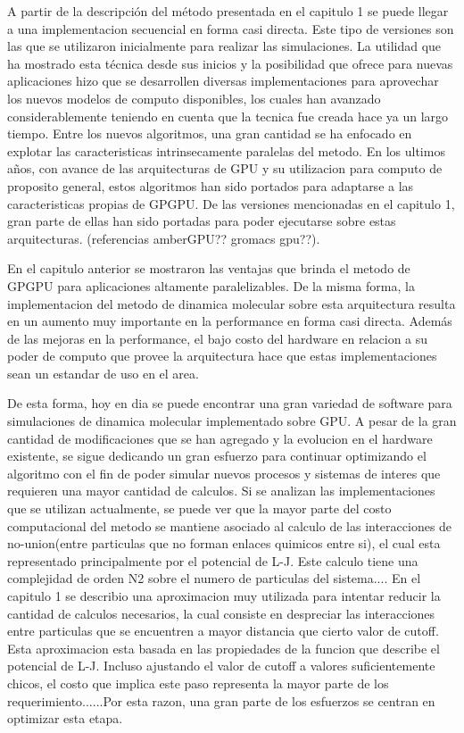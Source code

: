 \documentclass[a4paper,10pt]{report}
\begin{document}
A partir de la descripción del método presentada en el capitulo 1 se puede llegar a una implementacion secuencial en forma casi directa. Este tipo de versiones son las que se utilizaron inicialmente para realizar las simulaciones.
La utilidad que ha mostrado esta técnica desde sus inicios y la posibilidad que ofrece para nuevas aplicaciones hizo que se desarrollen diversas implementaciones para aprovechar los nuevos modelos de computo disponibles, los cuales han avanzado considerablemente teniendo en cuenta que la tecnica fue creada hace ya un largo tiempo. 
Entre los nuevos algoritmos, una gran cantidad se ha enfocado en explotar las caracteristicas intrinsecamente paralelas del metodo. En los ultimos años, con avance de las arquitecturas de GPU y su utilizacion para computo de proposito general, estos algoritmos han sido portados para adaptarse a las caracteristicas propias de GPGPU.
De las versiones mencionadas en el capitulo 1, gran parte de ellas han sido portadas para poder ejecutarse sobre estas arquitecturas. (referencias amberGPU?? gromacs gpu??).

En el capitulo anterior se mostraron las ventajas que brinda el metodo de GPGPU para aplicaciones altamente paralelizables. De la misma forma,  la implementacion del metodo de dinamica molecular sobre esta arquitectura resulta en un aumento muy importante en la performance en forma casi directa. Además de las mejoras en la performance, el bajo costo del hardware en relacion a su poder de computo que provee la arquitectura hace que estas implementaciones sean un estandar de uso en el area.  

De esta forma, hoy en dia se puede encontrar una gran variedad de software para simulaciones de dinamica molecular implementado sobre GPU. A pesar de la gran cantidad de modificaciones que se han agregado y la evolucion en el hardware existente, se sigue dedicando un gran esfuerzo para continuar optimizando el algoritmo con el fin de poder simular nuevos procesos y sistemas de interes que requieren una mayor cantidad de calculos. 
Si se analizan las implementaciones que se utilizan actualmente, se puede ver que la mayor parte del costo computacional del metodo se mantiene asociado al calculo de las interacciones de no-union(entre particulas que no forman enlaces quimicos entre si), el cual esta representado principalmente por el potencial de L-J. Este calculo tiene una complejidad de orden N2 sobre el numero de particulas del sistema....
En el capitulo 1 se describio una aproximacion muy utilizada para intentar reducir la cantidad de calculos necesarios, la cual consiste en despreciar las interacciones entre particulas que se encuentren a mayor distancia que cierto valor de cutoff. Esta aproximacion esta basada en las propiedades de la funcion que describe el potencial de L-J. Incluso ajustando el valor de cutoff a valores suficientemente chicos, el costo que implica este paso representa la mayor parte de los requerimiento......Por esta razon, una gran parte de los esfuerzos se centran en optimizar esta etapa.
 
\end{document}
